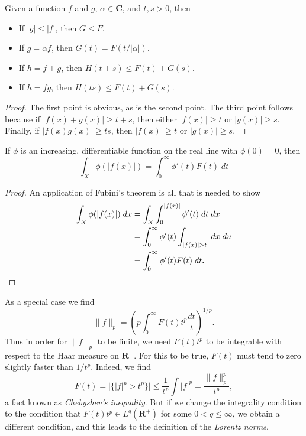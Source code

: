\begin{lemma}
  Given a function $f$ and $g$, $\alpha \in \mathbf{C}$, and $t,s > 0$, then
  \begin{itemize}
    \item If $|g| \leq |f|$, then $G \leq F$.
    \item If $g = \alpha f$, then $G(t) = F(t/|\alpha|)$.
    \item If $h = f + g$, then $H(t+s) \leq F(t) + G(s)$.
    \item If $h = fg$, then $H(ts) \leq F(t) + G(s)$.
  \end{itemize}
\end{lemma}
\begin{proof}
    The first point is obvious, as is the second point. The third point follows because if $|f(x) + g(x)| \geq t + s$, then either $|f(x)| \geq t$ or $|g(x)| \geq s$. Finally, if $|f(x) g(x)| \geq ts$, then $|f(x)| \geq t$ or $|g(x)| \geq s$.
\end{proof}

\begin{theorem}
  If $\phi$ is an increasing, differentiable function on the real line with $\phi(0) = 0$, then
  \[ \int_X \phi(|f(x)|) = \int_0^\infty \phi'(t) F(t)\; dt \]
\end{theorem}
\begin{proof}
  An application of Fubini's theorem is all that is needed to show
  \begin{align*}
    \int_X \phi(|f(x)|)\; dx &= \int_X \int_0^{|f(x)|} \phi'(t)\; dt\; dx\\
    &= \int_0^\infty \phi'(t) \int_{|f(x)| > t}\; dx\; du\\
    &= \int_0^\infty \phi'(t) F(t)\; dt. \qedhere
  \end{align*}
\end{proof}

As a special case we find
%
\[ \| f \|_p = \left( p \int_0^\infty F(t) t^p \frac{dt}{t} \right)^{1/p}. \]
%
Thus in order for $\| f \|_p$ to be finite, we need $F(t) t^p$ to be integrable with respect to the Haar measure on $\mathbf{R}^+$. For this to be true, $F(t)$ must tend to zero slightly faster than $1/t^p$. Indeed, we find
%
\[ F(t) = |\{ |f|^p > t^p \}| \leq \frac{1}{t^p} \int |f|^p = \frac{\| f \|_p^p}{t^p}, \]
%
a fact known as \emph{Chebyshev's inequality}. But if we change the integrality condition to the condition that $F(t) t^p \in L^q(\mathbf{R}^+)$ for some $0 < q \leq \infty$, we obtain a different condition, and this leads to the definition of the \emph{Lorentz norms}.

